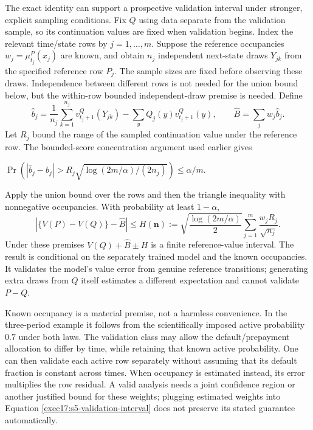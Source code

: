 The exact identity can support a prospective validation interval under
stronger, explicit sampling conditions. Fix $Q$ using data separate from
the validation sample, so its continuation values are fixed when validation
begins. Index the relevant time/state rows by $j=1,\ldots,m$. Suppose the
reference occupancies $w_j=\mu^P_{t_j}(x_j)$ are known, and obtain $n_j$
independent next-state draws $Y_{jk}$ from the specified reference row $P_j$.
The sample sizes are fixed before observing these draws. Independence
between different rows is not needed for the union bound below, but the
within-row bounded independent-draw premise is needed. Define
\begin{equation}
 \widehat b_j=\frac1{n_j}\sum_{k=1}^{n_j}v^Q_{t_j+1}(Y_{jk})
              -\sum_y Q_j(y)v^Q_{t_j+1}(y),\qquad
 \widehat B=\sum_jw_j\widehat b_j.
 \label{exec17:s5-validation-residual}
\end{equation}
Let $R_j$ bound the range of the sampled continuation value under the
reference row. The bounded-score concentration argument used earlier gives
\begin{center}
$\Pr(|\widehat b_j-b_j|>R_j\sqrt{\log(2m/\alpha)/(2n_j)})\leq\alpha/m$.
\end{center}
Apply the union bound over the rows and then the triangle inequality with
nonnegative occupancies. With probability at least $1-\alpha$,
\begin{equation}
 \left|\{V(P)-V(Q)\}-\widehat B\right|\leq
 H(\boldsymbol n):=
 \sqrt{\frac{\log(2m/\alpha)}2}
 \sum_{j=1}^m\frac{w_jR_j}{\sqrt{n_j}}.
 \label{exec17:s5-validation-interval}
\end{equation}
Under these premises $V(Q)+\widehat B\pm H$ is a finite reference-value
interval. The result is conditional on the separately trained model and the
known occupancies. It validates the model's value error from genuine
reference transitions; generating extra draws from $Q$ itself estimates a
different expectation and cannot validate $P-Q$.

Known occupancy is a material premise, not a harmless convenience. In the
three-period example it follows from the scientifically imposed active
probability $0.7$ under both laws. The validation class may allow the
default/prepayment allocation to differ by time, while retaining that known
active probability. One can then validate each active row separately without
assuming that its default fraction is constant across times. When occupancy
is estimated instead, its error multiplies the row residual. A valid analysis
needs a joint confidence region or another justified bound for these weights;
plugging estimated weights into Equation \eqref{exec17:s5-validation-interval}
does not preserve its stated guarantee automatically.

